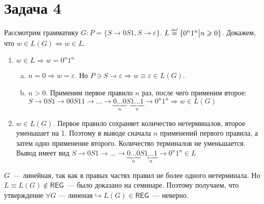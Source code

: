 \documentclass[a4paper]{article}
\def\REG{{\mathsf{REG}}}
\def\eqdef{\overset{\mbox{\tiny def}}{=}}
\begin{document}
\section*{Задача 4}
Рассмотрим грамматику $G\colon P=\{S\longrightarrow 0S1,S\longrightarrow \varepsilon\}$. $L\eqdef\{0^n1^n\big| n\geqslant 0\}$. Докажем, что $w\in L(G)\Leftrightarrow w\in L$.
\begin{enumerate}
\item $w\in L\Rightarrow w=0^n1^n$\begin{enumerate}[a.]
\item $n=0\Rightarrow w=\varepsilon$. Но $P\ni S\longrightarrow \varepsilon\Rightarrow w\equiv\varepsilon\in L(G)$.
\item $n>0$. Применим первое правило $n$ раз, после чего применим второе: $S\longrightarrow 0S1\longrightarrow 00S11\longrightarrow...\longrightarrow \underbrace{0...0}_{n}S\underbrace{1...1}_n\longrightarrow 0^n1^n\Rightarrow w\in L(G)$
\end{enumerate}
\item $w\in L(G)$. Первое правило сохраняет количество нетерминалов, второе уменьшает на 1. Поэтому в выводе сначала $n$ применений первого правила, а затем одно применение второго. Количество терминалов не уменьшается. Вывод имеет вид $S\longrightarrow 0S1\longrightarrow...\longrightarrow \underbrace{0...0}_nS\underbrace{1...1}_n\longrightarrow 0^n1^n\in L$
\end{enumerate}
$G$~--- линейная, так как в правых частях правил не более одного нетерминала. Но $L\equiv L(G)\notin\REG$~--- было доказано на семинаре. Поэтому получаем, что утверждение $\forall G\mbox{~--- линеная}\hookrightarrow L(G)\in\REG$~--- неверно.
\end{document}
